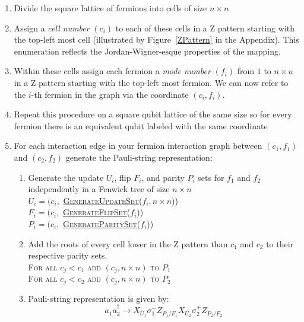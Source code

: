 \documentclass[pdftex,pra,aps,twocolumn,twoside]{revtex4-2}
\theoremstyle{plain}
\theoremstyle{note}
\newcommand\+{{\footnotesize \raisebox{0.3ex}{+}}}
\begin{document}
\begin{enumerate}
    \item Divide the square lattice of fermions into cells of size $n \times n$
    \item Assign a \textit{cell number} $(c_i)$ to each of these cells in a Z pattern starting with the top-left most cell (illustrated by Figure~\ref{ZPattern} in the Appendix). 
    This enumeration reflects the Jordan-Wigner-esque properties of the mapping.
    \item Within these cells assign each fermion a \textit{mode number} $(f_i)$ from $1$ to $n\times n$ in a Z pattern starting with the top-left most fermion. We can now refer to the $i$-th fermion in the graph via the coordinate $(c_i, f_i)$.
    \item Repeat this procedure on a square qubit lattice of the same size so for every fermion there is an equivalent qubit labeled with the same coordinate
    \item For each interaction edge in your fermion interaction graph between $(c_1, f_1)$ and $(c_2, f_2)$ generate the Pauli-string representation:
    \begin{enumerate}
        \item Generate the update $U_i$, flip $F_i$, and parity $P_i$ sets for $f_1$ and $f_2$ independently in a Fenwick tree of size $n \times n$\\
        \textsc{$U_i = (c_i, $ \hyperref[GenerateUpdateSet]{GenerateUpdateSet}($f_i, n\times n$))}\\
        \textsc{$F_i = (c_i, $ \hyperref[GenerateFlipSet]{GenerateFlipSet}($f_i$))}\\
        \textsc{$P_i = (c_i, $ \hyperref[GenerateParitySet]{GenerateParitySet}($f_i$))}
        \item Add the roots of every cell lower in the Z pattern than $c_1$ and $c_2$ to their respective parity sets. \\
        \textsc{For all $c_j < c_1$ add $(c_j, n \times n)$ to $P_1$}\\
        \textsc{For all $c_j < c_2$ add $(c_j, n \times n)$ to $P_2$}
        \item Pauli-string representation is given by:\\
            \begin{dmath*}[style={\footnotesize}]
                    a_1a^{\dagger}_2  \rightarrow X_{U_1}  \sigma^-_1  Z_{P_1/F_1}  X_{U_2}  \sigma^+_2Z_{P_2/F_2}

\end{dmath*}
\end{enumerate}
\end{enumerate}
\end{document}

